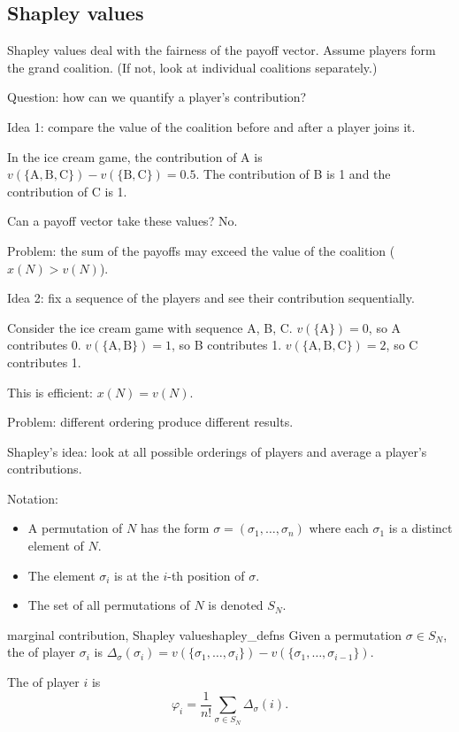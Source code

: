 \documentclass[12pt,letterpaper]{report}
\begin{document}
\subsection{Shapley values}

Shapley values deal with the fairness of the payoff vector.
Assume players form the grand coalition.
(If not, look at individual coalitions separately.)

Question: how can we quantify a player's contribution?

Idea 1: compare the value of the coalition before and after a player joins it.

\begin{ex}
  In the ice cream game, the contribution of A is
  $v(\{\text{A}, \text{B}, \text{C}\}) - v(\{\text{B}, \text{C}\}) = 0.5$.
  The contribution of B is 1 and the contribution of C is 1.

  Can a payoff vector take these values?
  No.
\end{ex}

Problem: the sum of the payoffs may exceed the value of the coalition ($x(N) > v(N)$).

Idea 2: fix a sequence of the players and see their contribution sequentially.

\begin{ex}
  Consider the ice cream game with sequence A, B, C.
  $v(\{\text{A}\}) = 0$, so A contributes 0.
  $v(\{\text{A}, \text{B}\}) = 1$, so B contributes 1.
  $v(\{\text{A}, \text{B}, \text{C}\}) = 2$, so C contributes 1.

  This is efficient: $x(N) = v(N)$.
\end{ex}

Problem: different ordering produce different results.

Shapley's idea: look at all possible orderings of players and average a player's contributions.

Notation:
\begin{itemize}
  \item
  A permutation of $N$ has the form $\sigma = (\sigma_1, \ldots, \sigma_n)$ where each $\sigma_1$ is
  a distinct element of $N$.
  \item
  The element $\sigma_i$ is at the $i$-th position of $\sigma$.
  \item
  The set of all permutations of $N$ is denoted $S_N$.
\end{itemize}

\begin{defn}{marginal contribution, Shapley value}{shapley_defns}
  Given a permutation $\sigma \in S_N$, the  of player $\sigma_i$ is
  $\Delta_\sigma(\sigma_i) = v(\{\sigma_1, \ldots, \sigma_i\}) -
    v(\{\sigma_1, \ldots, \sigma_{i - 1}\})$.

    The  of player $i$ is
    \[
      \varphi_i = \frac{1}{n!} \sum_{\sigma \in S_N} \Delta_\sigma(i).
    \]
\end{defn}
\end{document}
